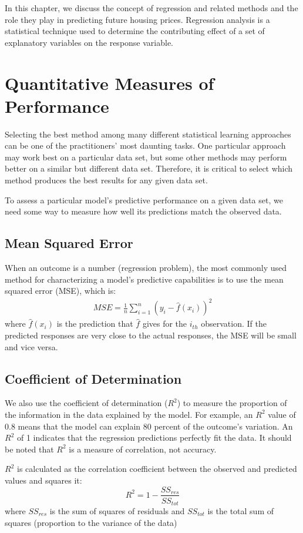 In this chapter, we discuss the concept of regression and related methods and
the role they play in predicting future housing prices. Regression analysis is a
statistical technique used to determine the contributing effect of a set of
explanatory variables on the response variable.

\section{Quantitative Measures of Performance}
Selecting the best method among many different statistical learning approaches
can be one of the practitioners' most daunting tasks.  One particular approach
may work best on a particular data set, but some other methods may perform
better on a similar but different data set.
Therefore, it is critical to select which method produces the best results for
any given data set.

To assess a particular model's predictive performance on a given data set, we
need some way to measure how well its predictions match the observed data.
\subsection{Mean Squared Error}
When
an outcome is a number (regression problem), the most commonly used method for
characterizing a model's predictive capabilities is to use the mean squared
error (MSE), which is:
\begin{eqnarray}
    \label{eqn:mse}
    MSE = \frac{1}{n} \sum_{i=1}^{n}(y_i - \hat{f}(x_i))^2
\end{eqnarray}
where $\hat{f}(x_i)$ is the prediction that $\hat{f}$ gives for the $i_{th}$
observation. If the predicted responses are very close to the actual responses,
the MSE will be small and vice versa.

\subsection{Coefficient of Determination}
We also use the coefficient of determination ($R^2$) to measure the proportion
of the information in the data explained by the model.  For example, an $R^2$
value of 0.8 means that the model can explain  80 percent of the outcome's
variation. An $R^2$ of 1 indicates that the regression predictions perfectly fit
the data. It should be noted that $R^2$ is a measure of correlation, not
accuracy.

\noindent $R^2$ is calculated as the correlation coefficient between the
observed and predicted values and squares it:
\[ R^2 = 1 - \frac{SS_{res}}{SS_{tot}}\]
where $SS_{res}$ is the sum of squares of residuals and $SS_{tot}$ is the total
sum of squares (proportion to the variance of the data)

